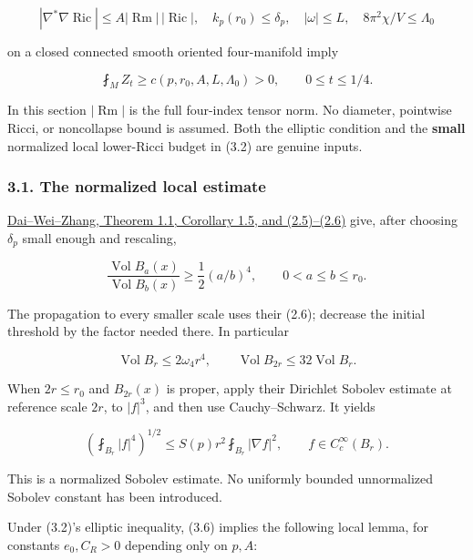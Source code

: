 \documentclass[
  10pt,
]{article}
\begin{document}
\[
 |\nabla^*\nabla\operatorname{Ric}|
              \le A|\operatorname{Rm}|\,|\operatorname{Ric}|,
 \quad k_p(r_0)\le\delta_p,
 \quad |\omega|\le L,
 \quad 8\pi^2\chi/V\le\Lambda_0                       \tag{3.2}
\]

on a closed connected smooth oriented four-manifold imply

\[
                  \boxed{\fint_M Z_t\ge c(p,r_0,A,L,\Lambda_0)>0,}
                  \qquad 0\le t\le1/4.             \tag{3.3}
\]

In this section \(|\operatorname{Rm}|\) is the full four-index tensor
norm. No diameter, pointwise Ricci, or noncollapse bound is assumed.
Both the elliptic condition and the \textbf{small} normalized local
lower-Ricci budget in (3.2) are genuine inputs.

\hypertarget{the-normalized-local-estimate}{%
\subsubsection{3.1. The normalized local
estimate}\label{the-normalized-local-estimate}}

\href{https://web.math.ucsb.edu/~wei/paper/Dai-Wei-Zhang.pdf}{Dai--Wei--Zhang,
Theorem 1.1, Corollary 1.5, and (2.5)--(2.6)} give, after choosing
\(\delta_p\) small enough and rescaling,

\[
 \frac{\operatorname{Vol}B_a(x)}{\operatorname{Vol}B_b(x)}
                 \ge\frac12(a/b)^4,
                 \qquad 0<a\le b\le r_0.           \tag{3.4}
\]

The propagation to every smaller scale uses their (2.6); decrease the
initial threshold by the factor needed there. In particular

\[
 \operatorname{Vol}B_r\le2\omega_4r^4,
 \qquad \operatorname{Vol}B_{2r}\le32\operatorname{Vol}B_r.
                                                        \tag{3.5}
\]

When \(2r\le r_0\) and \(B_{2r}(x)\) is proper, apply their Dirichlet
Sobolev estimate at reference scale \(2r\), to \(|f|^3\), and then use
Cauchy--Schwarz. It yields

\[
 \left(\fint_{B_r}|f|^4\right)^{1/2}
            \le S(p)r^2\fint_{B_r}|\nabla f|^2,
                         \qquad f\in C_c^\infty(B_r).           \tag{3.6}
\]

This is a normalized Sobolev estimate. No uniformly bounded unnormalized
Sobolev constant has been introduced.

Under (3.2)'s elliptic inequality, (3.6) implies the following local
lemma, for constants \(e_0,C_R>0\) depending only on \(p,A\):
\end{document}
